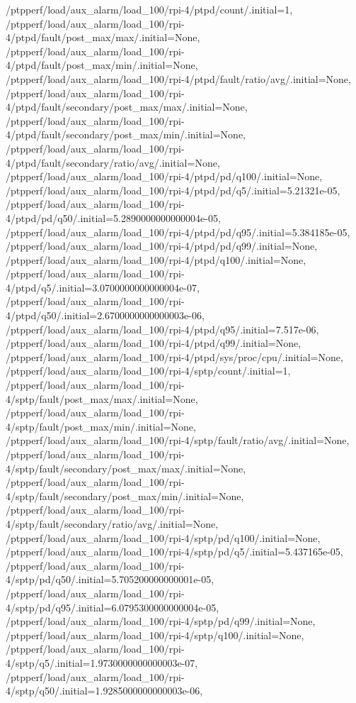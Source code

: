{    /ptpperf/load/aux_alarm/load_100/rpi-4/ptpd/count/.initial=1,
    /ptpperf/load/aux_alarm/load_100/rpi-4/ptpd/fault/post_max/max/.initial=None,
    /ptpperf/load/aux_alarm/load_100/rpi-4/ptpd/fault/post_max/min/.initial=None,
    /ptpperf/load/aux_alarm/load_100/rpi-4/ptpd/fault/ratio/avg/.initial=None,
    /ptpperf/load/aux_alarm/load_100/rpi-4/ptpd/fault/secondary/post_max/max/.initial=None,
    /ptpperf/load/aux_alarm/load_100/rpi-4/ptpd/fault/secondary/post_max/min/.initial=None,
    /ptpperf/load/aux_alarm/load_100/rpi-4/ptpd/fault/secondary/ratio/avg/.initial=None,
    /ptpperf/load/aux_alarm/load_100/rpi-4/ptpd/pd/q100/.initial=None,
    /ptpperf/load/aux_alarm/load_100/rpi-4/ptpd/pd/q5/.initial=5.21321e-05,
    /ptpperf/load/aux_alarm/load_100/rpi-4/ptpd/pd/q50/.initial=5.2890000000000004e-05,
    /ptpperf/load/aux_alarm/load_100/rpi-4/ptpd/pd/q95/.initial=5.384185e-05,
    /ptpperf/load/aux_alarm/load_100/rpi-4/ptpd/pd/q99/.initial=None,
    /ptpperf/load/aux_alarm/load_100/rpi-4/ptpd/q100/.initial=None,
    /ptpperf/load/aux_alarm/load_100/rpi-4/ptpd/q5/.initial=3.0700000000000004e-07,
    /ptpperf/load/aux_alarm/load_100/rpi-4/ptpd/q50/.initial=2.6700000000000003e-06,
    /ptpperf/load/aux_alarm/load_100/rpi-4/ptpd/q95/.initial=7.517e-06,
    /ptpperf/load/aux_alarm/load_100/rpi-4/ptpd/q99/.initial=None,
    /ptpperf/load/aux_alarm/load_100/rpi-4/ptpd/sys/proc/cpu/.initial=None,
    /ptpperf/load/aux_alarm/load_100/rpi-4/sptp/count/.initial=1,
    /ptpperf/load/aux_alarm/load_100/rpi-4/sptp/fault/post_max/max/.initial=None,
    /ptpperf/load/aux_alarm/load_100/rpi-4/sptp/fault/post_max/min/.initial=None,
    /ptpperf/load/aux_alarm/load_100/rpi-4/sptp/fault/ratio/avg/.initial=None,
    /ptpperf/load/aux_alarm/load_100/rpi-4/sptp/fault/secondary/post_max/max/.initial=None,
    /ptpperf/load/aux_alarm/load_100/rpi-4/sptp/fault/secondary/post_max/min/.initial=None,
    /ptpperf/load/aux_alarm/load_100/rpi-4/sptp/fault/secondary/ratio/avg/.initial=None,
    /ptpperf/load/aux_alarm/load_100/rpi-4/sptp/pd/q100/.initial=None,
    /ptpperf/load/aux_alarm/load_100/rpi-4/sptp/pd/q5/.initial=5.437165e-05,
    /ptpperf/load/aux_alarm/load_100/rpi-4/sptp/pd/q50/.initial=5.705200000000001e-05,
    /ptpperf/load/aux_alarm/load_100/rpi-4/sptp/pd/q95/.initial=6.0795300000000004e-05,
    /ptpperf/load/aux_alarm/load_100/rpi-4/sptp/pd/q99/.initial=None,
    /ptpperf/load/aux_alarm/load_100/rpi-4/sptp/q100/.initial=None,
    /ptpperf/load/aux_alarm/load_100/rpi-4/sptp/q5/.initial=1.9730000000000003e-07,
    /ptpperf/load/aux_alarm/load_100/rpi-4/sptp/q50/.initial=1.9285000000000003e-06,
}
